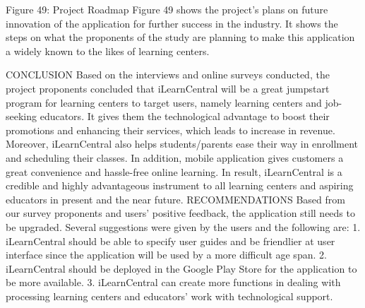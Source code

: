 Figure 49: Project Roadmap
	Figure 49 shows the project’s plans on future innovation of the application for further success in the industry.  It shows the steps on what the proponents of the study are planning to make this application a widely known to the likes of learning centers. 

CONCLUSION
	  Based on the interviews and online surveys conducted, the project proponents concluded that iLearnCentral will be a great jumpstart program for learning centers to target users, namely learning centers and job-seeking educators. It gives them the technological advantage to boost their promotions and enhancing their services, which leads to increase in revenue. Moreover, iLearnCentral also helps students/parents ease their way in enrollment and scheduling their classes. In addition, mobile application gives customers a great convenience and hassle-free online learning. In result, iLearnCentral is a credible and highly advantageous instrument to all learning centers and aspiring educators in present and the near future. 
RECOMMENDATIONS
Based from our survey proponents and users’ positive feedback, the application still needs to be upgraded. Several suggestions were given by the users and the following are: 
1.	iLearnCentral should be able to specify user guides and be friendlier at user interface since the application will be used by a more difficult age span. 
2.	iLearnCentral should be deployed in the Google Play Store for the application to be more available.
3.	 iLearnCentral can create more functions in dealing with processing learning centers and educators’ work with technological support.  



















